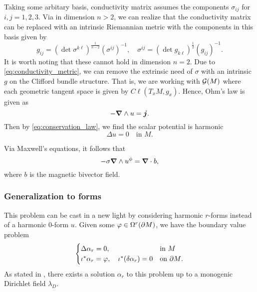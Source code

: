 Taking some arbitary basis, conductivity matrix assumes the components $\sigma_{ij}$ for $i,j=1,2,3$.  Via \cite{uhlmann_inverse_2014} in dimension $n>2$, we can realize that the conductivity matrix can be replaced with an intrinsic Riemannian metric with the components in this basis given by
\begin{equation}
\label{eq:conductivity_metric}
    g_{ij} = (\det \sigma^{k\ell} )^{\frac{1}{n-2}} (\sigma^{ij})^{-1}, \quad \sigma^{ij} = (\det g_{k\ell})^{\frac{1}{2}} (g_{ij})^{-1}.
\end{equation}
It is worth noting that these cannot hold in dimension $n=2$. Due to \cref{eq:conductivity_metric}, we can remove the extrinsic need of $\sigma$ with an intrinsic $g$ on the Clifford bundle structure. That is, we are working with $\mathcal{G}(M)$ where each geometric tangent space is given by $C\ell(T_xM,g_x)$. Hence, Ohm's law is given as
\begin{equation}
-\boldsymbol{\nabla} \wedge u = \boldsymbol{j}.
\end{equation}
Then by \cref{eq:conservation_law}, we find the scalar potential is harmonic
\begin{equation}
\Delta u = 0 \quad \textrm{in $M$}.
\end{equation}



Via Maxwell's equations, it follows that 
\begin{equation}
-\sigma \boldsymbol{\nabla} \wedge u^\phi = \boldsymbol{\nabla} \cdot b,
\end{equation}
where $b$ is the magnetic bivector field.


\subsubsection{Generalization to forms}

This problem can be cast in a new light by considering harmonic $r$-forms instead of a harmonic 0-form $u$. 
Given some $\varphi \in \Omega^r({\partial M})$, we have the boundary value problem
\begin{equation}
\label{eq:bvp_forms}
\begin{cases} 
\Delta \alpha_r = 0, & \textrm{in $M$}\\
\iota^* \alpha_r = \varphi, \quad \iota^*(\delta \alpha_r) = 0 & \textrm{on ${\partial M}$}.
\end{cases}
\end{equation}
As stated in \cite{belishev_dirichlet_2008}, there exists a solution $\alpha_r$ to this problem up to a monogenic Dirichlet field $\lambda_D$.

